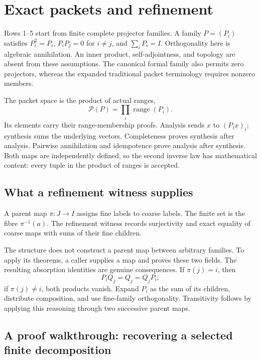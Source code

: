 \section{Exact packets and refinement}\label{sec:refinement}

Rows 1--5 start from finite complete projector families. A family $P=(P_i)$ satisfies $P_i^2=P_i$, $P_iP_j=0$ for $i\ne j$, and $\sum_iP_i=I$. Orthogonality here is algebraic annihilation. An inner product, self-adjointness, and topology are absent from these assumptions. The canonical formal family also permits zero projectors, whereas the expanded traditional packet terminology requires nonzero members.

The packet space is the product of actual ranges,
\[
\mathcal P(P)=\prod_i\operatorname{range}(P_i).
\]
Its elements carry their range-membership proofs. Analysis sends $x$ to $(P_i x)_i$; synthesis sums the underlying vectors. Completeness proves synthesis after analysis. Pairwise annihilation and idempotence prove analysis after synthesis. Both maps are independently defined, so the second inverse law has mathematical content: every tuple in the product of ranges is accepted.

\subsection{What a refinement witness supplies}

A parent map $\pi:J\to I$ assigns fine labels to coarse labels. The finite set  is the fibre $\pi^{-1}(a)$. The refinement witness records surjectivity and exact equality of coarse maps with sums of their fine children.

The structure does not construct a parent map between arbitrary families. To apply its theorems, a caller supplies a map and proves these two fields. The resulting absorption identities are genuine consequences. If $\pi(j)=i$, then
\[
P_iQ_j=Q_j=Q_jP_i;
\]
if $\pi(j)\ne i$, both products vanish. Expand $P_i$ as the sum of its children, distribute composition, and use fine-family orthogonality. Transitivity follows by applying this reasoning through two successive parent maps.

\subsection{A proof walkthrough: recovering a selected finite decomposition}

